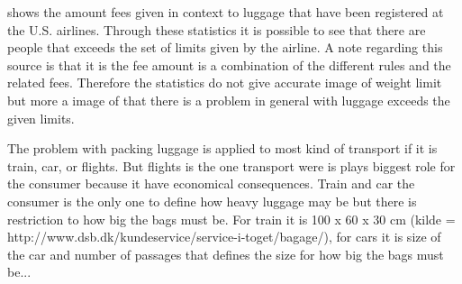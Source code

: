 \citep{airstat} shows the amount fees given in context to luggage that have been registered at the U.S. airlines. Through these statistics it is possible to see that there are people that exceeds the set of limits given by the airline. A note regarding this source is that it is the fee amount is a combination of the different rules and the related fees. Therefore the statistics do not give accurate image of weight limit but more a image of that there is a problem in general with luggage exceeds the given limits.

The problem with packing luggage is applied to most kind of transport if it is train, car, or flights. But flights is the one transport were is plays biggest role for the consumer because it have economical consequences. Train and car the consumer is the only one to define how heavy luggage may be but there is restriction to how big the bags must be. For train it is 100 x 60 x 30 cm (kilde = http://www.dsb.dk/kundeservice/service-i-toget/bagage/), for cars it is size of the car and number of passages that defines the size for how big the bags must be...